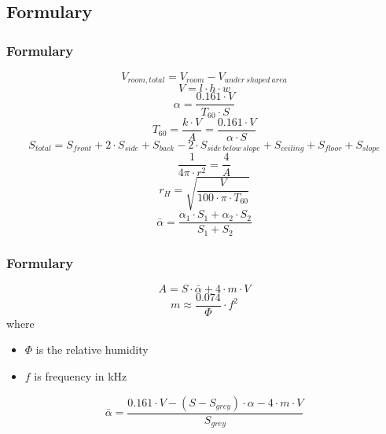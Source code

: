 \documentclass{article}
\begin{document}
\subsection{Formulary}
\subsubsection{Formulary}
\begin{equation}
V_{room,total}=V_{room}-V_{under\ shaped\ area}
\end{equation}
\begin{equation}
V=l\cdot h\cdot w
\end{equation}
\begin{equation}
\alpha=\frac{0.161\cdot V}{T_{60}\cdot S}
\end{equation}
\begin{equation}
T_{60}=\frac{k\cdot V}{A}=\frac{0.161\cdot V}{\alpha\cdot S}
\end{equation}
\begin{equation}
S_{total}=S_{front}+2\cdot S_{side}+S_{back}-2\cdot S_{side\ below\ slope}+S_{ceiling}+S_{floor}+S_{slope}
\end{equation}
\begin{equation}
\frac{1}{4\pi\cdot r^2}=\frac{4}{A}
\end{equation}
\begin{equation}
r_H=\sqrt{\frac{V}{100\cdot\pi\cdot T_{60}}}
\end{equation}
\begin{equation}
\bar{\alpha}=\frac{\alpha_1\cdot S_1+\alpha_2\cdot S_2}{S_1+S_2}
\end{equation}
\subsubsection{Formulary}
\begin{equation}
A=S\cdot\bar{\alpha}+4\cdot m\cdot V
\end{equation}
\begin{equation}
m\approx\frac{0.074}{\Phi}\cdot f^2
\end{equation}
where
\begin{itemize}
\item $\Phi$ is the relative humidity
\item $f$ is frequency in kHz
\end{itemize}
\begin{equation}
\bar{\alpha}=\frac{0.161\cdot V-(S-S_{grey})\cdot\alpha-4\cdot m\cdot V}{S_{grey}}
\end{equation}
\end{document}
